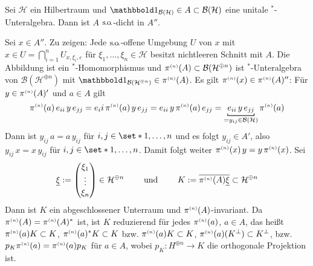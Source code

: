\begin{lemma}[label=lem:66]
	Sei $\mathcal{H}$ ein Hilbertraum und $\ind_{\mathcal{B}(\mathcal{H})} \in  A \subset \mathcal{B}(\mathcal{H})$ eine unitale $^*$-Unteralgebra.
	Dann ist $A$ $\mathrm{s\mkern-1.4mu.\mkern-.6mu o\mkern-1.7mu.}$-dicht in $A''$.
\end{lemma}
\begin{beweis}
	Sei $x \in A''$. Zu zeigen: Jede $\mathrm{s\mkern-1.4mu.\mkern-.6mu o\mkern-1.7mu.}$-offene Umgebung $U$ von $x$ mit $x \in U= \bigcap_{i=1}^n U_{x,\xi_i,\varepsilon}$ für $\xi_1, \ldots ,\xi_n \in \mathcal{H}$ besitzt nichtleeren Schnitt mit $A$.
	Die Abbildung 
	ist ein $^*$-Homomorphismus und $\pi^\ssbrace{n}(A) \subset \mathcal{B} \enbrace*{\mathcal{H}^{\oplus n}}$ ist $^*$-Unteralgebra von $\mathcal{B}(\mathcal{H}^{\oplus n})$ mit $\ind_{\mathcal{B}(\mathcal{H}^{\oplus n})}\in \pi^\ssbrace{n}(A)$.
	Es gilt $\pi^{\scriptscriptstyle(n)}(x) \in \pi^{\scriptscriptstyle(n)}(A)''$: Für $y \in \pi^{\scriptscriptstyle(n)}(A)'$ und $a \in A$ gilt
	\[
		\pi^\ssbrace{n}(a) \,e_{ii}\, y\, e_{jj} = e_ii\, \pi^\ssbrace{n}(a)\, y \,e_{jj} = e_{ii}\, y \,\pi^\ssbrace{n}(a) \,e_{jj} = \Underbracket{e_{ii} \,y \,e_{jj}}{=y_{ij}\in \mathcal{B}(\mathcal{H})} \,\pi^\ssbrace{n}(a)
	\]
	Dann ist $y_{ij}\,a = a \,y_{ij}$ für $i,j \in \set*{1,\ldots ,n}$ und es folgt $y_{ij} \in A'$, also $y_{ij} \,x = x \,y_{ij}$ für $i,j \in \set*{1,\ldots ,n}$.
	Damit folgt weiter $\pi^{\scriptscriptstyle(n)}(x) \, y = y \, \pi^{\scriptscriptstyle(n)}(x)$.
	Sei 
	\[
		\underline{\xi} := \begin{pmatrix}
			\xi_1 \\ \vdots \\ \xi_n
		\end{pmatrix} \in \mathcal{H}^{\oplus n} \qquad \text{ und } \qquad K:= \overline{\pi^{\scriptscriptstyle(n)}(A) \underline{\xi}} \subset \mathcal{H}^{\oplus n}
	\]
	Dann ist $K$ ein abgeschlossener Unterraum und $\pi^{\scriptscriptstyle(n)}(A)$-invariant.
	Da $\pi^{\scriptscriptstyle(n)}(A)= \pi^{\scriptscriptstyle(n)}(A)^*$ ist, ist $K$ reduzierend für jedes $\pi^{\scriptscriptstyle(n)}(a)$, $a \in A$, das heißt $\pi^{\scriptscriptstyle(n)}(a) K \subset K$, $\pi^{\scriptscriptstyle(n)}(a)^*K \subset K$ bzw. $\pi^{\scriptscriptstyle(n)}(a) K \subset K$, $\pi^{\scriptscriptstyle(n)}(a)(K^\bot) \subset K^\bot$, bzw. $p_K \pi^{\scriptscriptstyle(n)}(a)= \pi^{\scriptscriptstyle(n)}(a) p_K$ für $a  \in A$, wobei $p_K \colon H^{\oplus n} \to K$ die orthogonale Projektion ist.

\end{beweis}
